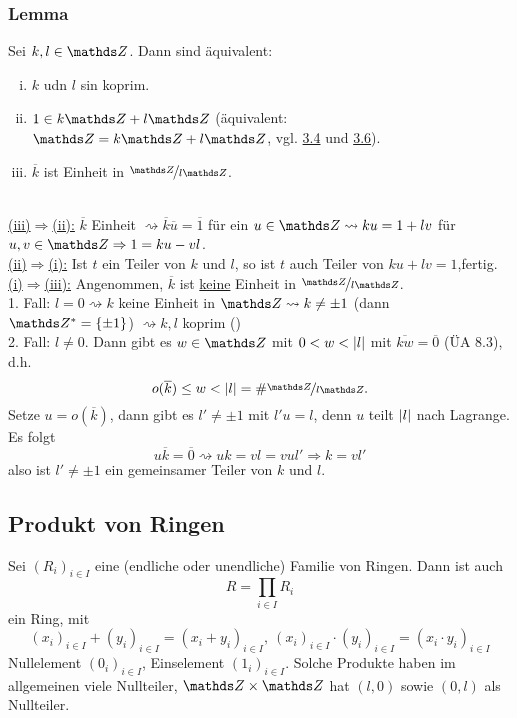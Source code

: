 \subsubsection*{Lemma}
Sei $k,l\in\Z$. 
Dann sind äquivalent:
\begin{enumerate}[(i)]
	\item $k$ udn $l$ sin koprim.
	\item $1\in k\Z+l\Z$ (äquivalent: $\Z=k\Z+l\Z$, vgl. \hyperref[sub:homomor_ideale]{3.4} und \hyperref[sub:rechnen_ideale]{3.6}).
	\item $\overline{k}$ ist Einheit in $\nicefrac{\Z}{l\Z}$.
\end{enumerate}

\\
\uline{(iii)$\Rightarrow$(ii):}
$\overline{k}$ Einheit $\rightsquigarrow \overline{k}\overline{u}=\overline{1}$ für ein $u\in \Z \rightsquigarrow ku=1+lv$ für $u,v\in \Z \Rightarrow 1=ku-vl$.\\
\uline{(ii)$\Rightarrow$(i):}
Ist $t$ ein Teiler von $k$ und $l$, so ist $t$ auch Teiler von $ku+lv=1$,fertig.\\
\uline{(i)$\Rightarrow$(iii):}
Angenommen, $\overline{k}$ ist \uline{keine} Einheit in $\nicefrac{\Z}{l\Z}$.\\
1. Fall: $l=0\rightsquigarrow k$ keine Einheit in $\Z\rightsquigarrow k\neq \pm 1$ (dann $\Z^*=\{\pm1\}$) $\rightsquigarrow k,l$ koprim (\checkmark)\\
2. Fall: $l\neq 0$.
Dann gibt es $w\in \Z$ mit $0<w<\left\vert l\right\vert$ mit $\overline{kw}=\overline{0}$ (ÜA 8.3), d.h.
\[
o(\overline{k})\le w<\abs{l}=\#\nicefrac{\Z}{l\Z}.
\]
Setze $u=o(\overline{k})$, dann gibt es $l'\neq \pm 1$ mit $l'u=l$, denn $u$ teilt $\left\vert l\right\vert$ nach Lagrange.\\
Es folgt
\[
u\overline{k}=\overline{0}\rightsquigarrow uk=vl=vul'\Rightarrow k=vl'
\]
also ist $l'\neq \pm 1$ ein gemeinsamer Teiler von $k$ und $l$.

\subsection{Produkt von Ringen}
\label{sub:produkt_ringe}
Sei $(R_i)_{i\in I}$ eine (endliche oder unendliche) Familie von Ringen.
Dann ist auch
\[
R=\prod_{i\in I}R_i
\]
ein Ring, mit 
\[
(x_i)_{i\in I}+(y_i)_{i\in I}=(x_i+y_i)_{i\in I},~(x_i)_{i\in I}\cdot (y_i)_{i\in I}=(x_i\cdot y_i)_{i\in I}
\]
Nullelement $(0_i)_{i\in I}$, Einselement $(1_i)_{i\in I}$.
Solche Produkte haben im allgemeinen viele Nullteiler, $\Z\times \Z$ hat $(l,0)$ sowie $(0,l)$ als Nullteiler.


